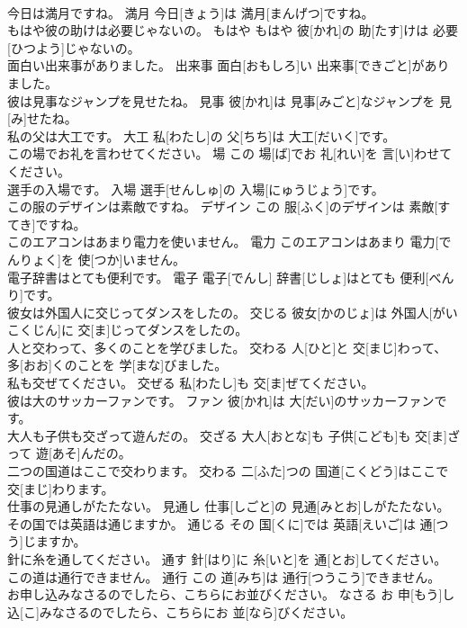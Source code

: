 \documentclass[8pt]{extreport}
\begin{document}
\begin{CJK}{UTF8}{min}
\\	今日は満月ですね。	満月	今日[きょう]は 満月[まんげつ]ですね。	
\\	もはや彼の助けは必要じゃないの。	もはや	もはや 彼[かれ]の 助[たす]けは 必要[ひつよう]じゃないの。	
\\	面白い出来事がありました。	出来事	面白[おもしろ]い 出来事[できごと]がありました。	
\\	彼は見事なジャンプを見せたね。	見事	彼[かれ]は 見事[みごと]なジャンプを 見[み]せたね。	
\\	私の父は大工です。	大工	私[わたし]の 父[ちち]は 大工[だいく]です。	
\\	この場でお礼を言わせてください。	場	この 場[ば]でお 礼[れい]を 言[い]わせてください。	
\\	選手の入場です。	入場	選手[せんしゅ]の 入場[にゅうじょう]です。	
\\	この服のデザインは素敵ですね。	デザイン	この 服[ふく]のデザインは 素敵[すてき]ですね。	
\\	このエアコンはあまり電力を使いません。	電力	このエアコンはあまり 電力[でんりょく]を 使[つか]いません。	
\\	電子辞書はとても便利です。	電子	電子[でんし] 辞書[じしょ]はとても 便利[べんり]です。	
\\	彼女は外国人に交じってダンスをしたの。	交じる	彼女[かのじょ]は 外国人[がいこくじん]に 交[ま]じってダンスをしたの。	
\\	人と交わって、多くのことを学びました。	交わる	人[ひと]と 交[まじ]わって、 多[おお]くのことを 学[まな]びました。	
\\	私も交ぜてください。	交ぜる	私[わたし]も 交[ま]ぜてください。	
\\	彼は大のサッカーファンです。	ファン	彼[かれ]は 大[だい]のサッカーファンです。	
\\	大人も子供も交ざって遊んだの。	交ざる	大人[おとな]も 子供[こども]も 交[ま]ざって 遊[あそ]んだの。	
\\	二つの国道はここで交わります。	交わる	二[ふた]つの 国道[こくどう]はここで 交[まじ]わります。	
\\	仕事の見通しがたたない。	見通し	仕事[しごと]の 見通[みとお]しがたたない。	
\\	その国では英語は通じますか。	通じる	その 国[くに]では 英語[えいご]は 通[つう]じますか。	
\\	針に糸を通してください。	通す	針[はり]に 糸[いと]を 通[とお]してください。	
\\	この道は通行できません。	通行	この 道[みち]は 通行[つうこう]できません。	
\\	お申し込みなさるのでしたら、こちらにお並びください。	なさる	お 申[もう]し 込[こ]みなさるのでしたら、こちらにお 並[なら]びください。	

\end{CJK}
\end{document}
